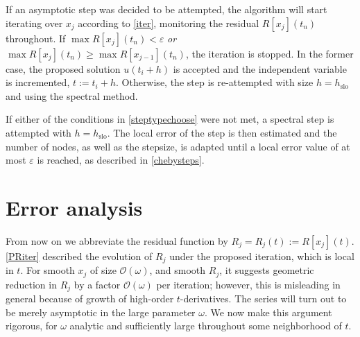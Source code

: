 \documentclass[10pt]{article}
\newcommand{\bigO}{{\mathcal O}}
\newcommand{\om}{\omega}
\begin{document}
If an asymptotic step was decided to be attempted, the algorithm will start
iterating over $x_j$ according to \cref{iter}, monitoring the residual
$R[x_j](t_n)$ throughout. If $\max R[x_j](t_n) < \varepsilon$ \emph{or} $\max
R[x_j](t_n) \geq \max R[x_{j-1}](t_n)$, the iteration is stopped. In the former
case, the proposed solution $u(t_i+h)$ is accepted and the independent variable
is incremented, $t := t_i + h$. Otherwise, the step is re-attempted with size
$h = h_{\text{slo}}$ and using the spectral method. 

If either of the conditions in \cref{steptypechoose} were not met, a spectral
step is attempted with $h = h_{\text{slo}}$. The local error of the step is
then estimated and the number of nodes, as well as the stepsize, is
adapted until a local error value of at most $\varepsilon$ is reached, as described in
\cref{chebysteps}.


\section{Error analysis \label{errorana}}

From now on we abbreviate the residual function by $R_j = R_j(t) := R[x_j](t)$.
\cref{PRiter} described the evolution of $R_j$
under the proposed iteration, which is local in $t$.
For smooth $x_j$ of size $\bigO(\om)$, and smooth $R_j$,
it suggests geometric reduction in $R_j$ by a factor $\bigO(\om)$ per iteration;
however, this is misleading in general because of
growth of high-order $t$-derivatives.
The series will turn out to be merely asymptotic in the large parameter $\om$.
We now make this argument rigorous, for $\om$ analytic
and sufficiently large throughout some neighborhood of $t$.

\end{document}
